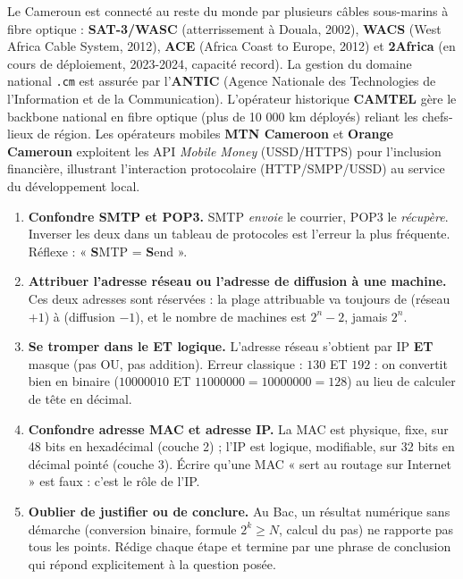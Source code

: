 \documentclass[11pt]{article}
\begin{document}
\begin{savaistu}
Le Cameroun est connecté au reste du monde par plusieurs câbles sous-marins à fibre optique : \textbf{SAT-3/WASC} (atterrissement à Douala, 2002), \textbf{WACS} (West Africa Cable System, 2012), \textbf{ACE} (Africa Coast to Europe, 2012) et \textbf{2Africa} (en cours de déploiement, 2023-2024, capacité record). La gestion du domaine national \texttt{.cm} est assurée par l'\textbf{ANTIC} (Agence Nationale des Technologies de l'Information et de la Communication). L'opérateur historique \textbf{CAMTEL} gère le backbone national en fibre optique (plus de 10 000 km déployés) reliant les chefs-lieux de région. Les opérateurs mobiles \textbf{MTN Cameroon} et \textbf{Orange Cameroun} exploitent les API \emph{Mobile Money} (USSD/HTTPS) pour l'inclusion financière, illustrant l'interaction protocolaire (HTTP/SMPP/USSD) au service du développement local.
\end{savaistu}

\begin{attention}
\begin{enumerate}
\item \textbf{Confondre SMTP et POP3.} SMTP \emph{envoie} le courrier, POP3 le \emph{récupère}. Inverser les deux dans un tableau de protocoles est l'erreur la plus fréquente. Réflexe : « \textbf{S}MTP = \textbf{S}end ».
\item \textbf{Attribuer l'adresse réseau ou l'adresse de diffusion à une machine.} Ces deux adresses sont réservées : la plage attribuable va toujours de (réseau $+1$) à (diffusion $-1$), et le nombre de machines est $2^n - 2$, jamais $2^n$.
\item \textbf{Se tromper dans le ET logique.} L'adresse réseau s'obtient par IP \textbf{ET} masque (pas OU, pas addition). Erreur classique : $130$ ET $192$ : on convertit bien en binaire ($10000010$ ET $11000000 = 10000000 = 128$) au lieu de calculer de tête en décimal.
\item \textbf{Confondre adresse MAC et adresse IP.} La MAC est physique, fixe, sur 48 bits en hexadécimal (couche 2) ; l'IP est logique, modifiable, sur 32 bits en décimal pointé (couche 3). Écrire qu'une MAC « sert au routage sur Internet » est faux : c'est le rôle de l'IP.
\item \textbf{Oublier de justifier ou de conclure.} Au Bac, un résultat numérique sans démarche (conversion binaire, formule $2^k \geq N$, calcul du pas) ne rapporte pas tous les points. Rédige chaque étape et termine par une phrase de conclusion qui répond explicitement à la question posée.
\end{enumerate}
\end{attention}
\end{document}
